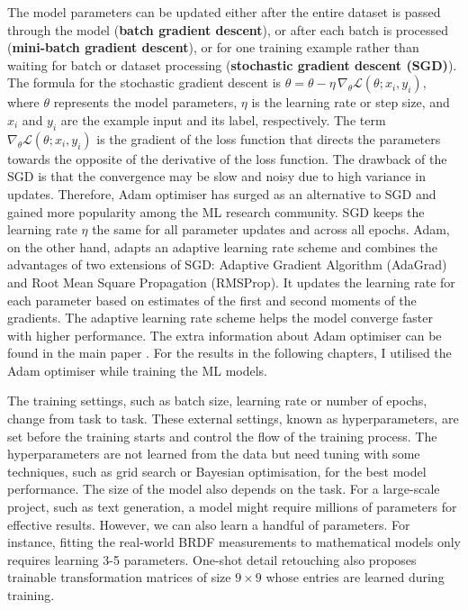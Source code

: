 The model parameters can be updated either after the entire dataset is passed through the model (\textbf{batch gradient descent}), or after each batch is processed (\textbf{mini-batch gradient descent}), or for one training example rather than waiting for batch or dataset processing (\textbf{stochastic gradient descent (SGD)}). The formula for the stochastic gradient descent is $\theta = \theta - \eta \, \nabla_{\theta} \mathcal{L}(\theta; x_i, y_i)$, where $\theta$ represents the model parameters, $\eta$ is the learning rate or step size, and $x_i$ and $y_i$ are the example input and its label, respectively. The term $\nabla_{\theta} \mathcal{L}(\theta; x_i, y_i)$ is the gradient of the loss function that directs the parameters towards the opposite of the derivative of the loss function. The drawback of the SGD is that the convergence may be slow and noisy due to high variance in updates. Therefore, Adam optimiser has surged as an alternative to SGD and gained more popularity among the ML research community. SGD keeps the learning rate $\eta$ the same for all parameter updates and across all epochs. Adam, on the other hand,  adapts an adaptive learning rate scheme and combines the advantages of two extensions of SGD: Adaptive Gradient Algorithm (AdaGrad) and Root Mean Square Propagation (RMSProp). It updates the learning rate for each parameter based on estimates of the first and second moments of the gradients. The adaptive learning rate scheme helps the model converge faster with higher performance. The extra information about Adam optimiser can be found in the main paper \cite{kingma2014adam}. For the results in the following chapters, I utilised the Adam optimiser while training the ML models.

The training settings, such as batch size, learning rate or number of epochs, change from task to task. These external settings, known as hyperparameters, are set before the training starts and control the flow of the training process. The hyperparameters are not learned from the data but need tuning with some techniques, such as grid search or Bayesian optimisation, for the best model performance. The size of the model also depends on the task. For a large-scale project, such as text generation, a model might require millions of parameters for effective results. However, we can also learn a handful of parameters. For instance, fitting the real-world BRDF measurements to mathematical models only requires learning 3-5 parameters. One-shot detail retouching also proposes trainable transformation matrices of size $9 \times 9$ whose entries are learned during training.

